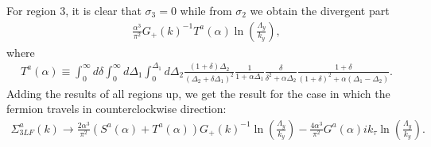 \documentclass[prx,amsmath,amssymb, notitlepage, onecolumn,
nofootinbib,
superscriptaddress,
longbibliography
]{revtex4-1}
\newcommand{\beq}{\begin{eqnarray}}
\newcommand{\eeq}{\end{eqnarray}}
\begin{document}
%
For region 3, it is clear that $\sigma_3 = 0$ while from $\sigma_2$ we obtain the divergent part
\beq
\frac{\alpha^3}{\pi^2}G_+(k)^{-1} T^a(\alpha)\ln\left(\frac{\Lambda_y}{k_y}\right),
\eeq
where
\beq\label{eq: def of Ta}
T^a(\alpha) \equiv \int_0^\infty d \delta \int_0^\infty d \Delta_1 \int_0^{\Delta_1} d \Delta_2 \frac{(1+\delta)\Delta_2}{(\Delta_2+\delta \Delta_1)^2}\frac{1}{1 + \alpha\Delta_1}\frac{\delta}{\delta^{2} + \alpha\Delta_2}\frac{1+\delta}{(1+\delta)^2 + \alpha(\Delta_1-\Delta_2)}.
\eeq
%
Adding the results of all regions up, we get the result for the case in which the fermion travels in counterclockwise direction:
\beq\label{eq: 3LFa div part}
\Sigma_{3LF}^a(k) \rightarrow \frac{ 2\alpha^3}{\pi^2}\left(S^a(\alpha) + T^a(\alpha)\right)G_+(k)^{-1}\ln\left(\frac{\Lambda_y}{k_y}\right)-\frac{ 4\alpha^3}{\pi^2}G^a(\alpha)i k_\tau\ln\left(\frac{\Lambda_y}{k_y}\right).
\eeq
\end{document}
